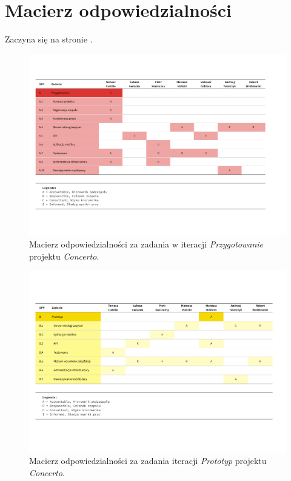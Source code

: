 \documentclass[10pt]{dokument-ppi}
\begin{document}
\MakeDokumentMeta


\section{Macierz odpowiedzialności}

Zaczyna się na stronie \pageref{fig:macierz}.

\begin{figure}[p]
    \includegraphics[angle=270, trim=1cm 1cm 1cm 1cm, width=\textwidth]{./figury/macierz-odpowiedzialnosci-A-przygotowanie}
    \caption{Macierz odpowiedzialności za zadania w iteracji \emph{Przygotowanie} projektu \emph{Concerto}.}
    \label{fig:macierz}
\end{figure}

\begin{figure}[p]
    \ContinuedFloat
    \includegraphics[angle=270, trim=1cm 1cm 1cm 1cm, width=\textwidth]{./figury/macierz-odpowiedzialnosci-B-prototyp}
    \caption[]{Macierz odpowiedzialności za zadania iteracji \emph{Prototyp} projektu \emph{Concerto}.}
\end{figure}
\end{document}
